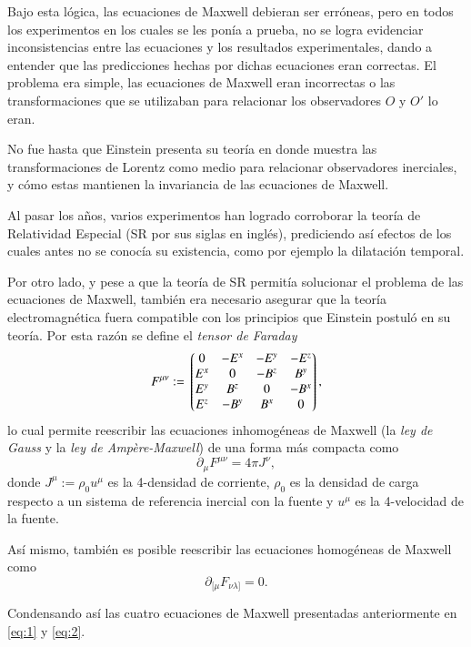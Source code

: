 Bajo esta lógica, las ecuaciones de Maxwell debieran ser erróneas, pero en todos los experimentos en los cuales se les ponía a prueba, no se logra evidenciar inconsistencias entre las ecuaciones y los resultados experimentales, dando a entender que las predicciones hechas por dichas ecuaciones eran correctas. El problema era simple, las ecuaciones de Maxwell eran incorrectas o las transformaciones que se utilizaban para relacionar los observadores $O$ y $O'$ lo eran.

No fue hasta que Einstein presenta su teoría en donde muestra las transformaciones de Lorentz como medio para relacionar observadores inerciales, y cómo estas mantienen la invariancia de las ecuaciones de Maxwell.

Al pasar los años, varios experimentos han logrado corroborar la teoría de Relatividad Especial (SR por sus siglas en inglés), prediciendo así efectos de los cuales antes no se conocía su existencia, como por ejemplo la dilatación temporal.

Por otro lado, y pese a que la teoría de SR permitía solucionar el problema de las ecuaciones de Maxwell, también era necesario asegurar que la teoría electromagnética fuera compatible con los principios que Einstein postuló en su teoría. Por esta razón se define el \textit{tensor de Faraday}
\begin{equation}
F^{\mu \nu} := \mqty*(
0 & -E^x & -E^y & -E^z \\
E^x & 0 & -B^z & B^y \\
E^y & B^z & 0 & -B^x \\
E^z & -B^y & B^x & 0 \\ 
),
\end{equation}
lo cual permite reescribir las ecuaciones inhomogéneas de Maxwell (la \textit{ley de Gauss} y la \textit{ley de Ampère-Maxwell}) de una forma más compacta como
\begin{equation}
\label{eq:1}
\partial_{\mu} F^{\mu \nu} = 4\pi J^{\nu},
\end{equation}
donde $J^{\mu} := \rho_0 u^{\mu}$ es la 4-densidad de corriente, $\rho_0$ es la densidad de carga respecto a un sistema de referencia inercial con la fuente y $u^{\mu}$ es la 4-velocidad de la fuente.

Así mismo, también es posible reescribir las ecuaciones homogéneas de Maxwell como
\begin{equation}
\label{eq:2}
\partial_{[\mu} F_{\nu \lambda]} = 0.
\end{equation}

Condensando así las cuatro ecuaciones de Maxwell presentadas anteriormente en \eqref{eq:1} y \eqref{eq:2}.

